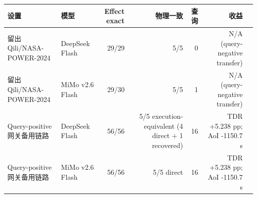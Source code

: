 \begin{tabular}{p{}p{}rrrrp{}}
\toprule
设置 & 模型 & Effect exact & 物理一致 & 查询 & 收益 \\
\midrule
留出 Qili/NASA-POWER-2024 & DeepSeek Flash & 29/29 & 5/5 & 0 & N/A (query-negative transfer) \\
留出 Qili/NASA-POWER-2024 & MiMo v2.6 Flash & 29/30 & 5/5 & 1 & N/A (query-negative transfer) \\
Query-positive 网关备用链路 & DeepSeek Flash & 56/56 & 5/5 execution-equivalent (4 direct + 1 recovered) & 16 & TDR +5.238 pp; AoI -1150.7 s \\
Query-positive 网关备用链路 & MiMo v2.6 Flash & 56/56 & 5/5 direct & 16 & TDR +5.238 pp; AoI -1150.7 s \\
\bottomrule
\end{tabular}
